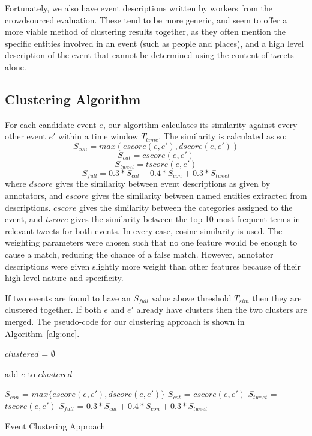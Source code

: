 Fortunately, we also have event descriptions written by workers from the crowdsourced evaluation.
These tend to be more generic, and seem to offer a more viable method of clustering results together, as they often mention the specific entities involved in an event (such as people and places), and a high level description of the event that cannot be determined using the content of tweets alone.

\subsection{Clustering Algorithm}
\label{sec:clusteringalg}
For each candidate event \(e\), our algorithm calculates its similarity against every other event \(e'\) within a time window \(T_{time}\). The similarity is calculated as so:
\[
S_{con} = max(escore(e, e'), dscore(e, e'))
\]
\[
S_{cat} = cscore(e, e')
\]
\[
S_{tweet} = tscore(e, e')
\]
\[
S_{full} = 0.3 * S_{cat} + 0.4 * S_{con} + 0.3 * S_{tweet}
\]
where \(dscore\) gives the similarity between event descriptions as given by annotators, and \(escore\) gives the similarity between named entities extracted from descriptions. \(cscore\) gives the similarity between the categories assigned to the event, and \(tscore\) gives the similarity between the top 10 most frequent terms in relevant tweets for both events.
In every case, cosine similarity is used.
The weighting parameters were chosen such that no one feature would be enough to cause a match, reducing the chance of a false match.
However, annotator descriptions were given slightly more weight than other features because of their high-level nature and specificity.

If two events are found to have an \(S_{full}\) value above threshold \(T_{sim}\) then they are clustered together. If both \(e\) and \(e'\) already have clusters then the two clusters are merged.
The pseudo-code for our clustering approach is shown in Algorithm~\ref{alg:one}.

\begin{algorithm}
$clustered$ = $\emptyset$\;
 {
	add $e$ to $clustered$\;
	 {

		$S_{con}$ = $max\{escore(e, e'), dscore(e, e')\}$\;
		$S_{cat}$ = $cscore(e, e')$\;
		$S_{tweet}$ = $tscore(e, e')$\;
		$S_{full}$ = $0.3 * S_{cat} + 0.4 * S_{con} + 0.3 * S_{tweet}$\;
		 {
			 
		}
	}
}
\caption{Event Clustering Approach}
\label{alg:one}
\end{algorithm}

